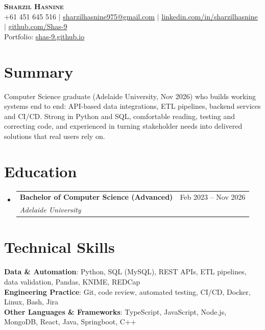 \documentclass[letterpaper,11pt]{article}
\makeatletter
\newcommand{\resumeSubheading}[4]{
  \vspace{0pt}\item
    \begin{tabular*}{0.97\textwidth}[t]{l@{\extracolsep{\fill}}r}
      \textbf{#1} & #2 \\
      \textit{\small#3} %
    \end{tabular*} %
    \textit{\small #4}
    \vspace{-7pt}
}
\newcommand{\resumeSubHeadingListStart}{\begin{itemize}[leftmargin=0.10in, label={}]}
\newcommand{\resumeSubHeadingListEnd}{\end{itemize}}
\makeatother
\begin{document}

\begin{center}
    \textbf{\Huge \scshape Sharzil Hasnine} \\ \vspace{5pt}
    +61 451 645 516 $|$ \href{mailto:sharzilhasnine975@gmail.com}{sharzilhasnine975@gmail.com} $|$ 
    \href{https://www.linkedin.com/in/sharzilhasnine/}{{linkedin.com/in/sharzilhasnine}} $|$
    \href{https://github.com/Shas-9}{{github.com/Shas-9}} \\
    Portfolio: \href{https://shas-9.github.io/}{shas-9.github.io}
\end{center}

\section{Summary}
\small{Computer Science graduate (Adelaide University, Nov 2026) who builds working systems end to end: API-based data integrations, ETL pipelines, backend services and CI/CD. Strong in Python and SQL, comfortable reading, testing and correcting code, and experienced in turning stakeholder needs into delivered solutions that real users rely on.}

\section{Education}
  \resumeSubHeadingListStart
    \resumeSubheading
      {Bachelor of Computer Science (Advanced)}{\small Feb 2023 -- Nov 2026}
      {Adelaide University}{}
  \resumeSubHeadingListEnd


\section{Technical Skills}
 \begin{itemize}[leftmargin=0.15in, label={}]
    \small{\item{
     \textbf{Data \& Automation}{: Python, SQL (MySQL), REST APIs, ETL pipelines, data validation, Pandas, KNIME, REDCap} \\
     \textbf{Engineering Practice}{: Git, code review, automated testing, CI/CD, Docker, Linux, Bash, Jira} \\
     \textbf{Other Languages \& Frameworks}{: TypeScript, JavaScript, Node.js, MongoDB, React, Java, Springboot, C++} \\
    }}
 \end{itemize}
\end{document}
